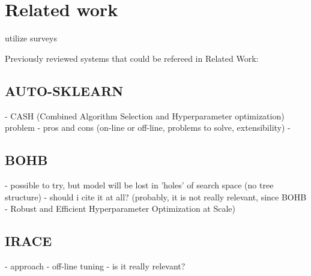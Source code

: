 \chapter{Related work}\label{relwork}
utilize surveys 


Previously reviewed systems that could be refereed in Related Work: 
\section{AUTO-SKLEARN}
- CASH (Combined Algorithm Selection and Hyperparameter optimization) problem
- pros and cons (on-line or off-line, problems to solve, extensibility)
- \cite{autosklearn:feurer2015efficient}

\section{BOHB}
- possible to try, but model will be lost in 'holes' of search space (no tree structure)
- should i cite it at all? (probably, it is not really relevant, since BOHB - Robust and Efficient Hyperparameter Optimization at Scale)

\section{IRACE}
- approach \cite{irace:lopez2016irace}
- off-line tuning
- is it really relevant?
